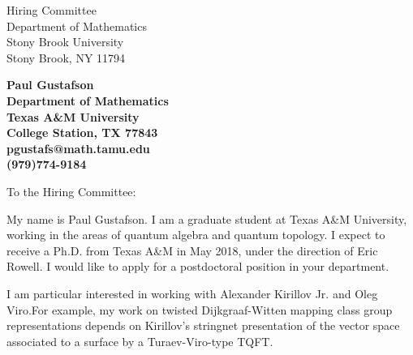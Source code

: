 \documentclass[11pt]{letter} %
\begin{document}

\begin{letter}{Hiring Committee \\
Department of Mathematics \\
Stony Brook University \\
Stony Brook, NY 11794}


\begin{center}
\large\bf Paul Gustafson \\ %
Department of Mathematics \\ Texas A\&M University \\ College Station, TX 77843 \\ pgustafs@math.tamu.edu \\ (979)774-9184 %
\end{center} 
\vfill



\opening{To the Hiring Committee:}

My name is Paul Gustafson. I am a graduate student at Texas A\&M University, working in the areas of quantum algebra and quantum topology. I expect to receive a Ph.D. from Texas A\&M in May 2018, under the direction of Eric Rowell. I would like to apply for a postdoctoral position in your department.

I am particular interested in working with Alexander Kirillov Jr. and Oleg Viro.For example, my work on twisted Dijkgraaf-Witten mapping class group representations depends on Kirillov's stringnet presentation of the vector space associated to a surface by a Turaev-Viro-type TQFT.


\end{letter}
\end{document}
